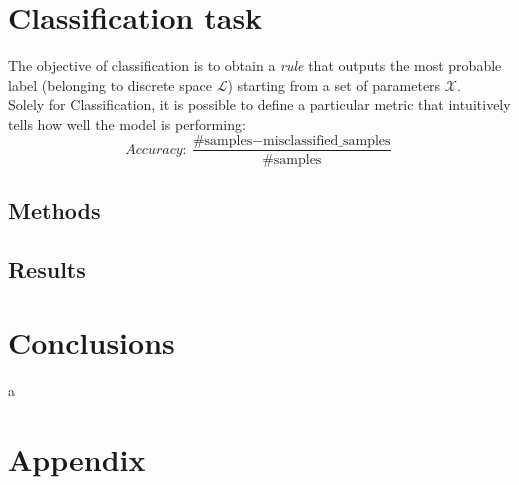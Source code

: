 \documentclass[11pt,a4paper,twocolumn]{IEEEtran}
\begin{document}
	\section{\textbf{Classification task}}
		The objective of classification is to obtain a \textit{rule} that outputs the most probable label (belonging to discrete space $\mathcal{L}$) starting from a set of parameters $\mathcal{X}$.\\
		Solely for Classification, it is possible to define a particular metric that intuitively tells how well the model is performing:
		$$Accuracy: \frac{\text{\#samples} - \text{misclassified\_samples}}{\text{\#samples}}$$
		\subsection{\textbf{Methods}}
		\subsection{\textbf{Results}}
			
	\section{\textbf{Conclusions}}
	
	\newpage
	a
	\newpage
	\onecolumn
	\section{\textbf{Appendix}}
		
	
\end{document}
